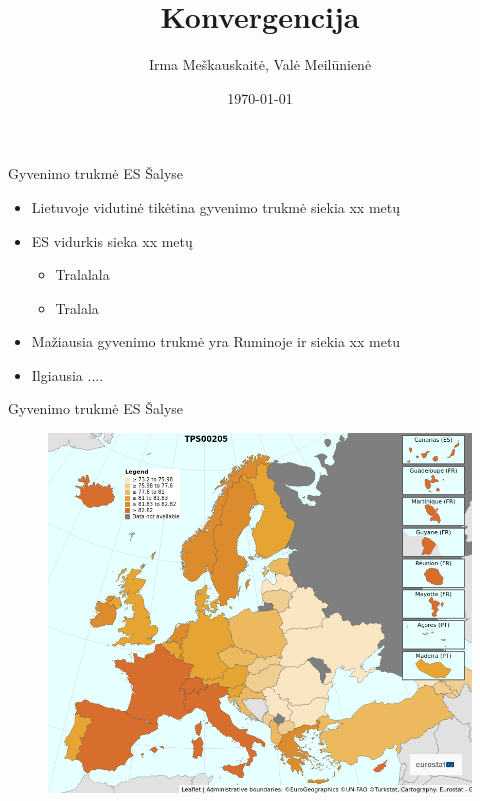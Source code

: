 \documentclass[11pt,xcolor=table,aspectratio=169]{beamer}
\author{Irma Meškauskaitė, Valė Meilūnienė}
\title{Konvergencija}
\date{\today}
\begin{document}
\begin{frame}
\titlepage
\end{frame}


\begin{frame}{Gyvenimo trukmė ES Šalyse}
\begin{itemize}
\item Lietuvoje vidutinė tikėtina gyvenimo trukmė siekia xx metų
\item ES vidurkis sieka xx metų
\begin{itemize}
\item Tralalala
\item Tralala
\end{itemize}
\item Mažiausia gyvenimo trukmė yra Ruminoje ir siekia xx metu
\item Ilgiausia ....
\end{itemize}
\end{frame}


\begin{frame}{Gyvenimo trukmė ES Šalyse}
\begin{figure}
\includegraphics[scale=0.275]{TPS00205_MAP_CNTR_2020-11-26T12 10 12Z.png}
\end{figure}
\end{frame}
\end{document}
